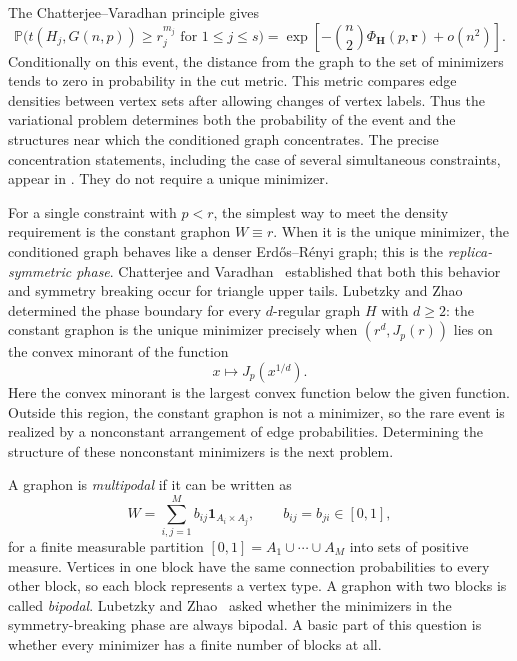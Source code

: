 The Chatterjee--Varadhan principle gives
\begin{equation}\label{eq:joint-upper-tail-rate}
  \mathbb P\bigl(t(H_j,G(n,p))\ge r_j^{m_j}\text{ for }1\le j\le s\bigr)
  =\exp\!\left[-\binom n2\Phi_{\mathbf H}(p,\mathbf r)+o(n^2)\right].
\end{equation}
Conditionally on this event, the distance from the graph to the set of
minimizers tends to zero in probability in the cut metric. This metric
compares edge densities between vertex sets after allowing changes of
vertex labels. Thus the variational problem determines both the
probability of the event and the structures near which the conditioned
graph concentrates. The precise concentration statements, including the
case of several simultaneous constraints, appear in
. They do not require a unique minimizer.

For a single constraint with $p<r$, the simplest way to meet the density
requirement is the constant graphon $W\equiv r$. When it is the unique
minimizer, the conditioned graph behaves like a denser Erd\H{o}s--R\'enyi
graph; this is the \emph{replica-symmetric phase}. Chatterjee
and Varadhan~\cite{ChatterjeeVaradhanLDP} established that both this
behavior and symmetry breaking occur for triangle upper tails.
Lubetzky and Zhao~\cite{lubetzky2015large} determined the phase boundary
for every $d$-regular graph $H$ with $d\ge2$: the constant graphon is the
unique minimizer precisely when $(r^d,J_p(r))$ lies on the convex minorant
of the function
\[
  x\longmapsto J_p(x^{1/d}).
\]
Here the convex minorant is the largest convex function below the given
function. Outside this region, the constant graphon is not a minimizer,
so the rare event is realized by a nonconstant arrangement of edge
probabilities. Determining the structure of these nonconstant minimizers
is the next problem.

A graphon is \emph{multipodal} if it can be written as
\[
  W=\sum_{i,j=1}^M b_{ij}\mathbf1_{A_i\times A_j},
  \qquad b_{ij}=b_{ji}\in[0,1],
\]
for a finite measurable partition $[0,1]=A_1\cup\cdots\cup A_M$ into
sets of positive measure. Vertices in one block have the same connection
probabilities to every other block, so each block represents a vertex
type. A graphon with two blocks is called \emph{bipodal}. Lubetzky and
Zhao~\cite[Section~7]{lubetzky2015large} asked whether the minimizers in
the symmetry-breaking phase are always bipodal. A basic part of this
question is whether every minimizer has a finite number of blocks at all.

